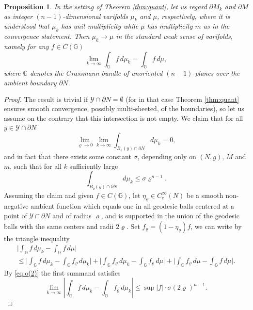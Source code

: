 \documentclass[10pt]{amsart}
\let\mathcal\mathscr
\newcounter{cas}
\newtheorem{prop}[thm]{Proposition}
\theoremstyle{definition}
\begin{document}
\begin{prop}\label{prop:boundaryconv}
In the setting of Theorem \ref{thm:quant}, let us regard $\partial M_k$ and $\partial M$ as integer $(n-1)$-dimensional varifolds $\mu_k$ and $\mu$, respectively, where it is understood that $\mu_k$ has unit multiplicity while $\mu$ has multiplicity $m$ as in the convergence statement. Then $\mu_k \to \mu$ in the standard weak sense of varifolds, namely for any $f\in C(\mathbb{G})$
\[
\lim_{k\to\infty}\int_{\mathbb{G}} f\,d\mu_k =\int_{\mathbb{G}} f\,d\mu,
\]
where $\mathbb{G}$ denotes the Grassmann bundle of unoriented $(n-1)$-planes over the ambient boundary $\partial N$.
\end{prop}

\begin{proof}
The result is trivial if $\mathcal{Y}\cap\partial N=\emptyset$ (for in that case Theorem \ref{thm:quant} ensures smooth convergence, possibly multi-sheeted, of the boundaries), so let us assume on the contrary that this intersection is not empty.
We claim that for all $y\in \mathcal{Y}\cap \partial N$
\begin{equation*}
\lim_{\varrho \to 0} \lim_{k\to\infty}\int_{B_\varrho (y)\cap \partial N} d\mu_k = 0,
\end{equation*}
and in fact that there exists some constant $\sigma$, depending only on $(N,g)$, $M$ and $m$, such that for all $k$ sufficiently large
\begin{equation}\label{eq:o(2)}
\int_{B_\varrho (y)\cap \partial N} d\mu_k \leq \sigma \varrho^{n-1}.
\end{equation}
Assuming the claim and given $f\in C(\mathbb{G})$, let $\eta_\varrho \in C^{\infty}_c(N)$ be a smooth non-negative ambient function which equals one in all geodesic balls centered at a point of $\mathcal{Y}\cap \partial N$ and of radius $\varrho$, and is supported in the union of the geodesic balls with the same centers and radii $2\varrho$. Set $f_\varrho = (1-\eta_\varrho)f$, we can write by the triangle inequality
\begin{multline*}
\biggl| \int_{\mathbb{G}} f\,d\mu_k -\int_{\mathbb{G}} f\,d\mu \biggr|\\\leq \biggl| \int_{\mathbb{G}} f\,d\mu_k -\int_{\mathbb{G}} f_\varrho\,d\mu_k \biggr|
+ \biggl| \int_{\mathbb{G}} f_\varrho\,d\mu_k -\int_{\mathbb{G}} f_\varrho\,d\mu \biggr|
+ \biggr| \int_{\mathbb{G}} f_\varrho\,d\mu -\int_{\mathbb{G}} f\,d\mu \biggr|.
\end{multline*}
By \eqref{eq:o(2)} the first summand satisfies
\[\lim_{k\to \infty} \left| \int_{\mathbb{G}} f\,d\mu_k -\int_{\mathbb{G}} f_\varrho\,d\mu_k \right| \leq \sup |f|\cdot \sigma(2\varrho)^{n-1}.
\]
\end{proof}
\end{document}
